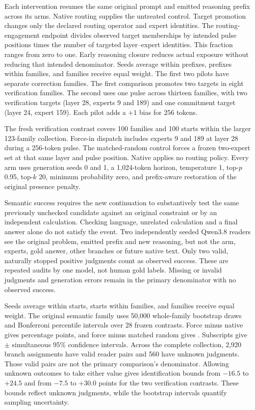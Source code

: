 Each intervention resumes the same original prompt and emitted reasoning prefix across its arms.
%
Native routing supplies the untreated control.
%
Target promotion changes only the declared routing operator and expert identities.
%
The routing-engagement endpoint divides observed target memberships by intended pulse positions times the number of targeted layer--expert identities.
%
This fraction ranges from zero to one.
%
Early reasoning closure reduces actual exposure without reducing that intended denominator.
%
Seeds average within prefixes, prefixes within families, and families receive equal weight.
%
The first two pilots have separate correction families.
%
The first comparison promotes two targets in eight verification families.
%
The second uses one pulse across thirteen families, with two verification targets (layer 28, experts 9 and 189) and one commitment target (layer 24, expert 159).
%
Each pilot adds a $+1$ bias for 256 tokens.
%

The fresh verification contrast covers 100 families and 100 starts within the larger 123-family collection.
%
Force-in dispatch includes experts 9 and 189 at layer 28 during a 256-token pulse.
%
The matched-random control forces a frozen two-expert set at that same layer and pulse position.
%
Native applies no routing policy.
%
Every arm uses generation seeds 0 and 1, a 1,024-token horizon, temperature 1, top-$p$ 0.95, top-$k$ 20, minimum probability zero, and prefix-aware restoration of the original presence penalty.
%

Semantic success requires the new continuation to substantively test the same previously unchecked candidate against an original constraint or by an independent calculation.
%
Checking language, unrelated calculation and a final answer alone do not satisfy the event.
%
Two independently seeded Qwen3.8 readers see the original problem, emitted prefix and new reasoning, but not the arm, experts, gold answer, other branches or future native text.
%
Only two valid, naturally stopped positive judgments count as observed success.
%
These are repeated audits by one model, not human gold labels.
%
Missing or invalid judgments and generation errors remain in the primary denominator with no observed success.
%

Seeds average within starts, starts within families, and families receive equal weight.
%
The original semantic family uses 50,000 whole-family bootstrap draws and Bonferroni percentile intervals over 28 frozen contrasts.
%
Force minus native gives  percentage points, and force minus matched random gives .
%
Subscripts give $\pm$ simultaneous 95\% confidence intervals.
%
Across the complete collection, 2,920 branch assignments have valid reader pairs and 560 have unknown judgments.
%
Those valid pairs are not the primary comparison's denominator.
%
Allowing unknown outcomes to take either value gives identification bounds from $-16.5$ to $+24.5$ and from $-7.5$ to $+30.0$ points for the two verification contrasts.
%
These bounds reflect unknown judgments, while the bootstrap intervals quantify sampling uncertainty.
%

